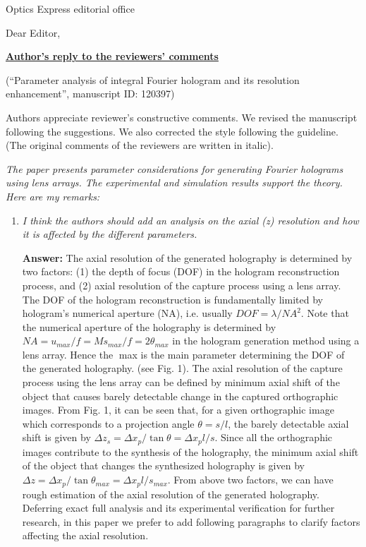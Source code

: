 \documentclass[a4paper,11pt]{letter}
\begin{document}
\begin{letter}{Optics Express editorial office}

\opening{Dear Editor,}
\begin{center}
{\bf \underline{Author's reply to the reviewers' comments} } \\
\end{center}
(``Parameter analysis of integral Fourier hologram and its resolution enhancement'', manuscript ID: 120397)

Authors appreciate reviewer's constructive comments. We revised the manuscript following the suggestions. We also corrected the style following the guideline. (The original comments of the reviewers are written in italic).

{}

\textit{The paper presents parameter considerations for generating Fourier holograms using lens arrays. The experimental and simulation results support the theory. Here are my remarks:}

\begin{enumerate}

\item \textit{I think the authors should add an analysis on the axial (z) resolution and how it is affected by the different parameters.}

\bigskip
\textbf{Answer:}
The axial resolution of the generated holography is determined by two factors: (1) the depth of focus (DOF) in the hologram reconstruction process, and (2) axial resolution of the capture process using a lens array. 
The DOF of the hologram reconstruction is fundamentally limited by hologram’s numerical aperture (NA), i.e. usually $DOF=\lambda/NA^2$. Note that the numerical aperture of the holography is determined by $NA=u_{max}/f=Ms_{max}/f=2\theta_{max}$ in the hologram generation method using a lens array. Hence the max is the main parameter determining the DOF of the generated holography. (see Fig. 1). 
The axial resolution of the capture process using the lens array can be defined by minimum axial shift of the object that causes barely detectable change in the captured orthographic images. From Fig. 1, it can be seen that, for a given orthographic image which corresponds to a projection angle $\theta=s/l$, the barely detectable axial shift is given by $\Delta z_s=\Delta x_p/\tan\theta=\Delta x_p l/s$. Since all the orthographic images contribute to the synthesis of the holography, the minimum axial shift of the object that changes the synthesized holography is given by $\Delta z=\Delta x_p/\tan\theta_{max}=\Delta x_p l/s_{max}$. 
From above two factors, we can have rough estimation of the axial resolution of the generated holography. Deferring exact full analysis and its experimental verification for further research, in this paper we prefer to add following paragraphs to clarify factors affecting the axial resolution.
 

\end{enumerate}
\end{letter}
\end{document}
